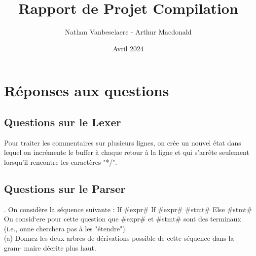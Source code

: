 \documentclass{report}
\title{\textbf{\Huge Rapport de Projet Compilation }}
\author{Nathan Vanbeselaere - Arthur Macdonald}
\date{Avril 2024}
\begin{document}
\maketitle
\newpage

\tableofcontents
\newpage

\chapter{Réponses aux questions}

    \section{Questions sur le Lexer}

        Pour traiter les commentaires sur plusieurs lignes, on crée un nouvel état dans lequel on incrémente le buffer à chaque retour à la ligne et qui s'arrête seulement lorsqu'il rencontre les caractères "*/". 

    \section{Questions sur le Parser}
    
    . On considère la séquence suivante : If \#expr\# If \#expr\# \#stmt\# Else \#stmt\#
\quad On consid`ere pour cette question que \#expr\# et \#stmt\# sont des terminaux (i.e., onne cherchera pas à les "étendre").\\
    
    \quad (a) Donnez les deux arbres de dérivations possible de cette séquence dans la gram-
    maire décrite plus haut.
\end{document}
